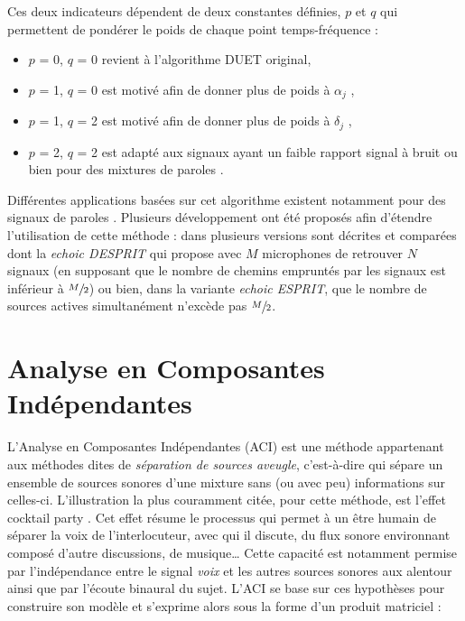 Ces deux indicateurs dépendent de deux constantes définies, $p$ et $q$ qui permettent de pondérer le poids de chaque point temps-fréquence :

\begin{itemize}
\item $p$ = 0, $q$ = 0 revient à l'algorithme DUET original,
\item $p$ = 1, $q$ = 0 est motivé afin de donner plus de poids à $\alpha_j$ \cite{yilmaz2004blind},
\item $p$ = 1, $q$ = 2 est motivé afin de donner plus de poids à $\delta_j$ \cite{yilmaz2004blind},
\item $p$ = 2, $q$ = 2 est adapté aux signaux ayant un faible rapport signal à bruit ou bien pour des mixtures de paroles \cite{melia2007underdetermined}.\\
\end{itemize}

Différentes applications basées sur cet algorithme existent notamment pour des signaux de paroles \cite{yilmaz2004blind, jourjine2000blind}.
Plusieurs développement ont été proposés afin d'étendre l'utilisation de cette méthode : dans  \cite{melia2007underdetermined} plusieurs versions sont décrites et comparées dont la \textit{echoic DESPRIT} qui propose avec $M$ microphones de retrouver $N$ signaux (en supposant que le nombre de chemins empruntés par les signaux est inférieur à $\sfrac{M}{2}$) ou bien, dans la variante \textit{echoic ESPRIT}, que le nombre de sources actives simultanément n'excède pas $\sfrac{M}{2}$. \\


\section{Analyse en Composantes Indépendantes}
L'Analyse en Composantes Indépendantes (ACI) \cite{comon_independent_1994, jutten1991blind} est une méthode appartenant aux méthodes dites de \textit{séparation de sources aveugle}, c'est-à-dire qui sépare un ensemble de sources sonores d'une mixture sans (ou avec peu) informations sur celles-ci. L'illustration la plus couramment citée, pour cette méthode, est l'effet \og cocktail party \fg{}. Cet effet résume le processus qui permet à un être humain de séparer la voix de l'interlocuteur, avec qui il discute, du flux sonore environnant composé d'autre discussions, de musique\dots{} Cette capacité est notamment permise par l'indépendance entre le signal \textit{voix} et les autres sources sonores aux alentour ainsi que par l'écoute binaural du sujet. L'ACI se base sur ces hypothèses pour construire son modèle et s'exprime alors sous la forme d'un produit matriciel :

